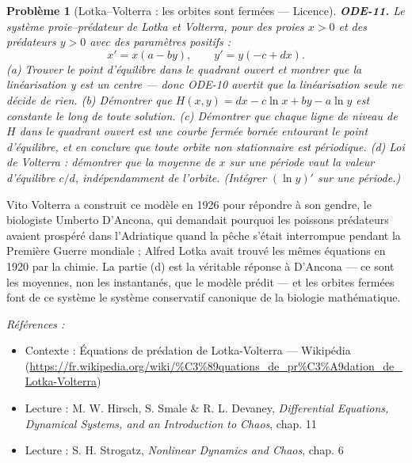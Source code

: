 \documentclass[11pt]{article}
\newtheorem{problem}{Problème}
\newenvironment{refs}{\par\small\noindent\emph{Références :}\begin{itemize}\setlength\itemsep{0pt}}{\end{itemize}\normalsize}
\begin{document}
\bigskip

\begin{problem}[{Lotka--Volterra : les orbites sont fermées --- Licence}]
\textbf{ODE-11.} Le système proie--prédateur de Lotka et Volterra, pour des
proies $ x >0 $ et des prédateurs $ y >0 $ avec des paramètres positifs :
\[ x' = x (a - b y), \qquad y' = y (-c + d x) . \]
(a) Trouver le point d'équilibre dans le quadrant ouvert et montrer que la linéarisation y est un
centre --- donc ODE-10 avertit que la linéarisation seule ne décide de rien.
(b) Démontrer que $ H(x, y) = d x - c \ln x + b y - a \ln y $ est constante le long de toute
solution.
(c) Démontrer que chaque ligne de niveau de $ H $ dans le quadrant ouvert est une courbe fermée
bornée entourant le point d'équilibre, et en conclure que toute orbite non stationnaire est
périodique.
(d) Loi de Volterra : démontrer que la moyenne de $ x $ sur une période vaut la valeur
d'équilibre $ c/d $, indépendamment de l'orbite. (Intégrer $ (\ln y)' $ sur une
période.)
\end{problem}

\noindent Vito Volterra a construit ce modèle en 1926 pour répondre à son gendre, le
biologiste Umberto D'Ancona, qui demandait pourquoi les poissons prédateurs avaient prospéré dans
l'Adriatique quand la pêche s'était interrompue pendant la Première Guerre mondiale ; Alfred
Lotka avait trouvé les mêmes équations en 1920 par la chimie. La partie (d) est la véritable
réponse à D'Ancona --- ce sont les moyennes, non les instantanés, que le modèle prédit --- et les
orbites fermées font de ce système le système conservatif canonique de la biologie
mathématique.

\begin{refs}
\item Contexte : Équations de prédation de Lotka-Volterra --- Wikipédia (\url{https://fr.wikipedia.org/wiki/%C3%89quations_de_pr%C3%A9dation_de_Lotka-Volterra})
\item Lecture : M. W. Hirsch, S. Smale \& R. L. Devaney, \textit{Differential Equations, Dynamical Systems, and an Introduction to Chaos}, chap. 11
\item Lecture : S. H. Strogatz, \textit{Nonlinear Dynamics and Chaos}, chap. 6
\end{refs}

\bigskip
\end{document}
